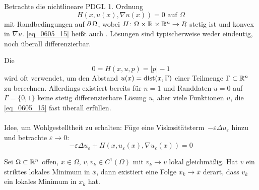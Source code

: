	Betrachte die nichtlineare PDGL 1. Ordnung 
	\begin{equation}
		H(x,u(x),\nabla u(x)) = 0 \text{ auf } \Omega \label{eq_0605_15}
	\end{equation}
	mit Randbedingungen auf $\operatorname{\partial} \Omega$, wobei $H\colon \Omega \times \mathbb{R} \times \mathbb{R}^n \rightarrow R$ stetig ist und konvex in $\nabla u$. \eqref{eq_0605_15} heißt auch . Lösungen sind typischerweise weder eindeutig, noch überall differenzierbar.
	
\begin{bsp}[Eikonalgleichung] \label{bsp_20}
	Die  \marginnote{[20]}
		\[ 0 = H(x,u,p) = |p|-1 \]
	wird oft verwendet, um den Abstand $u(x) = \operatorname{dist}(x,\Gamma)$ einer Teilmenge $\Gamma \subset \mathbb{R}^n$ zu berechnen. Allerdings existiert bereits für $n = 1$ und Randdaten $u = 0$ auf $\Gamma = \{0,1\}$ keine stetig differenzierbare Lösung $u$, aber viele Funktionen $u$, die \eqref{eq_0605_15} fast überall erfüllen. \\
	\mbox{} \\
	Idee, um Wohlgestelltheit zu erhalten: Füge eine \glqq Viskositätsterm\grqq \ $-\varepsilon \Delta u_\varepsilon$ hinzu und betrachte $\varepsilon \rightarrow 0$:
	\begin{equation}
		-\varepsilon \Delta u_\varepsilon + H(x,u_\varepsilon(x),\nabla u_\varepsilon (x)) = 0 \label{eq_0605_16}
	\end{equation}
\end{bsp}
	
\begin{lemma} \label{lemma_21}
	Sei $\Omega \subset \mathbb{R}^n$ offen, \marginnote{[21]} $\overline{x} \in \Omega$, $v, v_k \in C^1(\Omega)$ mit $v_k \rightarrow v$ lokal gleichmäßig. Hat $v$ ein striktes lokales Minimum in $\overline{x}$, dann existiert eine Folge $x_k \rightarrow \overline{x}$ derart, dass $v_k$ ein lokales Minimum in $x_k$ hat.
\end{lemma}
	
